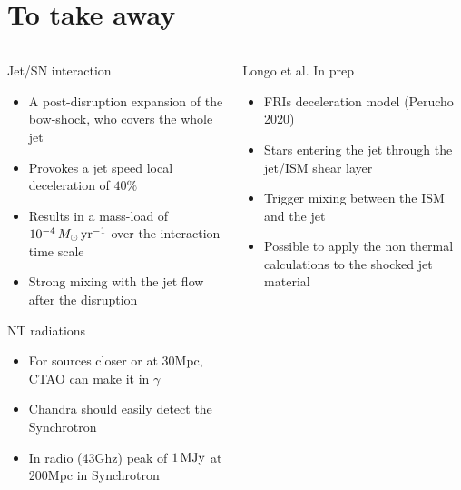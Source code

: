\section{To take away}
\begin{frame}
	\begin{columns}
		{\scriptsize
		\begin{column}{0.5\textwidth}
				\begin{alertblock}{Jet/SN interaction}
				\begin{itemize}
					\item A post-disruption expansion of the bow-shock, who covers the whole jet
					\item Provokes a jet speed local deceleration of $40\%$
					\item Results in a mass-load of $10^{-4}\,M_{\odot}\,{\rm yr}^{-1}$
					      over the interaction time scale 
					\item Strong mixing with the jet flow after the disruption
				\end{itemize}
			\end{alertblock}
				\begin{exampleblock}{NT radiations}
					\begin{itemize}
						\item For sources closer or at 30Mpc, CTAO can make it in $\gamma$ 
						\item Chandra should easily detect the Synchrotron
						\item In radio (43Ghz) peak of $1\,{\rm MJy}$ at 200Mpc in Synchrotron
					\end{itemize}
				\end{exampleblock}
		\end{column}
			\hspace{-.5cm}
		\begin{column}{0.5\textwidth}
			\begin{block}{Longo et al. In prep}
				\begin{itemize}
					\item FRIs deceleration model (Perucho 2020)
					\item Stars entering the jet through the jet/ISM shear layer
					\item Trigger mixing between the ISM and the jet 
					\item Possible to apply the non thermal calculations to the shocked jet material
				\end{itemize}
			\end{block}
			\centering

\end{column}}
\end{columns}
\end{frame}

